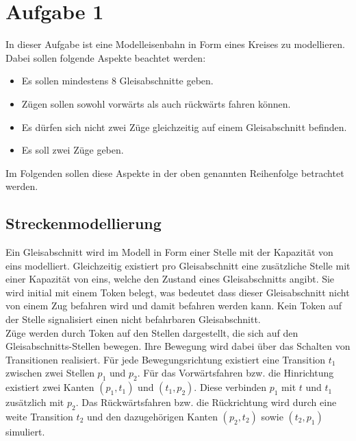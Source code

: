 \documentclass[10pt]{scrartcl}
\author{Carsten Noetzel, Armin Steudte}
\title{\titletext}
\date{23.03.2012}
\begin{document}
\maketitle

\setcounter{tocdepth}{3}
\tableofcontents
\listoffigures

\section{Aufgabe 1}
In dieser Aufgabe ist eine Modelleisenbahn in Form eines Kreises zu modellieren.
Dabei sollen folgende Aspekte beachtet werden:
\begin{itemize}
	\item Es sollen mindestens 8 Gleisabschnitte geben.
	\item Zügen sollen sowohl vorwärts als auch rückwärts fahren können.
	\item Es dürfen sich nicht zwei Züge gleichzeitig auf einem Gleisabschnitt befinden.
	\item Es soll zwei Züge geben.
\end{itemize}
Im Folgenden sollen diese Aspekte in der oben genannten Reihenfolge betrachtet werden.

\subsection{Streckenmodellierung}
Ein Gleisabschnitt wird im Modell in Form einer Stelle mit der Kapazität von eins modelliert.
Gleichzeitig existiert pro Gleisabschnitt eine zusätzliche Stelle mit einer Kapazität von eins, welche den Zustand eines Gleisabschnitts angibt.
Sie wird initial mit einem Token belegt, was bedeutet dass dieser Gleisabschnitt nicht von einem Zug befahren wird und damit befahren werden kann.
Kein Token auf der Stelle signalisiert einen nicht befahrbaren Gleisabschnitt.\\
Züge werden durch Token auf den Stellen dargestellt, die sich auf den Gleisabschnitts-Stellen bewegen.
Ihre Bewegung wird dabei über das Schalten von Transitionen realisiert.
Für jede Bewegungsrichtung existiert eine Transition $t_{1}$ zwischen zwei Stellen $p_{1}$ und $p_{2}$.
Für das Vorwärtsfahren bzw. die Hinrichtung existiert zwei Kanten $(p_{1},t_{1})$ und $(t_{1},p_{2})$. Diese verbinden $p_{1}$ mit $t$ und $t_{1}$ zusätzlich mit $p_{2}$.
Das Rückwärtsfahren bzw. die Rückrichtung wird durch eine weite Transition $t_{2}$ und den dazugehörigen Kanten $(p_{2},t_{2})$ sowie $(t_{2},p_{1})$ simuliert.
\end{document}
